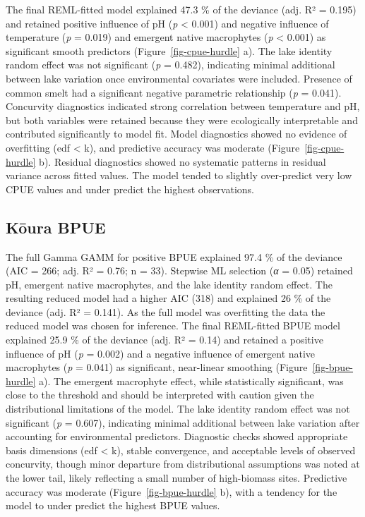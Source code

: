 \documentclass[
  12pt,
  a4paper,
  oneside]{scrbook}
\begin{document}
The final REML-fitted model explained 47.3 \% of the deviance (adj. R² =
0.195) and retained positive influence of pH (\emph{p} \textless{}
0.001) and negative influence of temperature (\emph{p} = 0.019) and
emergent native macrophytes (\emph{p} \textless{} 0.001) as significant
smooth predictors (Figure~\ref{fig-cpue-hurdle} a). The lake identity
random effect was not significant (\emph{p} = 0.482), indicating minimal
additional between lake variation once environmental covariates were
included. Presence of common smelt had a significant negative parametric
relationship (\emph{p} = 0.041). Concurvity diagnostics indicated strong
correlation between temperature and pH, but both variables were retained
because they were ecologically interpretable and contributed
significantly to model fit. Model diagnostics showed no evidence of
overfitting (edf \textless{} k), and predictive accuracy was moderate
(Figure~\ref{fig-cpue-hurdle} b). Residual diagnostics showed no
systematic patterns in residual variance across fitted values. The model
tended to slightly over-predict very low CPUE values and under predict
the highest observations.

\subsection{Kōura BPUE}\label{kux14dura-bpue}

The full Gamma GAMM for positive BPUE explained 97.4 \% of the deviance
(AIC = 266; adj. R² = 0.76; n = 33). Stepwise ML selection (\emph{α} =
0.05) retained pH, emergent native macrophytes, and the lake identity
random effect. The resulting reduced model had a higher AIC (318) and
explained 26 \% of the deviance (adj. R² = 0.141). As the full model was
overfitting the data the reduced model was chosen for inference. The
final REML-fitted BPUE model explained 25.9 \% of the deviance (adj. R²
= 0.14) and retained a positive influence of pH (\emph{p} = 0.002) and a
negative influence of emergent native macrophytes (\emph{p} = 0.041) as
significant, near-linear smoothing (Figure~\ref{fig-bpue-hurdle} a). The
emergent macrophyte effect, while statistically significant, was close
to the threshold and should be interpreted with caution given the
distributional limitations of the model. The lake identity random effect
was not significant (\emph{p} = 0.607), indicating minimal additional
between lake variation after accounting for environmental predictors.
Diagnostic checks showed appropriate basis dimensions (edf \textless{}
k), stable convergence, and acceptable levels of observed concurvity,
though minor departure from distributional assumptions was noted at the
lower tail, likely reflecting a small number of high-biomass sites.
Predictive accuracy was moderate (Figure~\ref{fig-bpue-hurdle} b), with
a tendency for the model to under predict the highest BPUE values.
\end{document}
